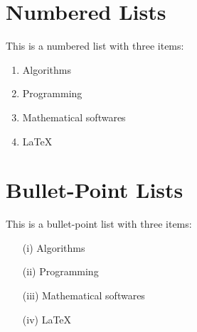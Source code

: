 \documentclass[a4paper,11pt]{article}
\begin{document}
\section{Numbered Lists}

This is a numbered list with three items:
\begin{enumerate}
\item Algorithms
\item Programming
\item Mathematical softwares
\item \LaTeX
\end{enumerate}


\section{Bullet-Point Lists}

This is a bullet-point list with three items:
\begin{itemize}
\item[(i)] Algorithms
\item[(ii)] Programming
\item[(iii)] Mathematical softwares
\item[(iv)] \LaTeX
\end{itemize}
\end{document}
